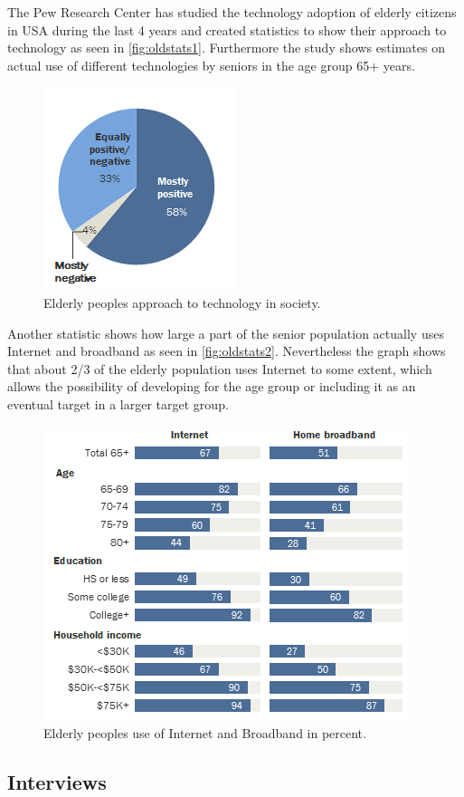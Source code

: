 		The Pew Research Center has studied the technology adoption of elderly citizens in USA during the last 4 years and created statistics \cite{seniorTechnology} to show their approach to technology as seen in \autoref {fig:oldstats1}. Furthermore the study shows estimates on actual use of different technologies by seniors in the age group 65+ years.
			\begin{figure}[H]
			\centering
			\includegraphics[width=0.4\linewidth]{figure/Analysis/oldpeoplestats1}
			\caption{Elderly peoples approach to technology in society.}
			\label{fig:oldstats1}
			\end{figure} 
		Another statistic shows how large a part of the senior population actually uses Internet and broadband as seen in \autoref{fig:oldstats2}. Nevertheless the graph shows that about 2/3 of the elderly population uses Internet to some extent, which allows the possibility of developing for the age group or including it as an eventual target in a larger target group.
			\begin{figure}[H]
			\centering
			\includegraphics[width=0.6\linewidth]{figure/Analysis/oldpeoplestats2}
			\caption{Elderly peoples use of Internet and Broadband in percent.}
			\label{fig:oldstats2}
		\end{figure} 
		
		\subsection{Interviews}

